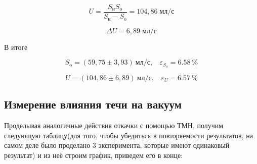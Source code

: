 \documentclass[a4paper, 12pt]{article} %
\begin{document}
\begin{equation}
	U = \frac{S_{\text{н}} S_{\text{o}}}{S_{\text{н}} - S_{\text{o}}} = 104,86 \; \text{мл/с}
\end{equation}

\begin{equation}
	\Delta U = 6,89\; \text{мл/с}
\end{equation}

В итоге

\begin{equation}
	S_{\text{o}} = (59,75 \pm 3,93) \  \text{мл/с}, \ \text{ }
	\varepsilon_{S_{\text{o}}} = 6.58\ \%
\end{equation}

\begin{equation}
	U = (104,86 \pm 6,89) \  \text{мл/с}, \ \text{ }
	\varepsilon_{U} = 6.57\ \%
\end{equation}


\subsection{Измерение влияния течи на вакуум}

Проделывая аналогичные действия откачки с помощью ТМН, получим следующую таблицу(для того, чтобы убедиться в повторяемости результатов, на самом деле было проделано 3 эксперимента, которые имеют одинаковый результат) и из неё строим график, приведем его в конце:
\end{document}
